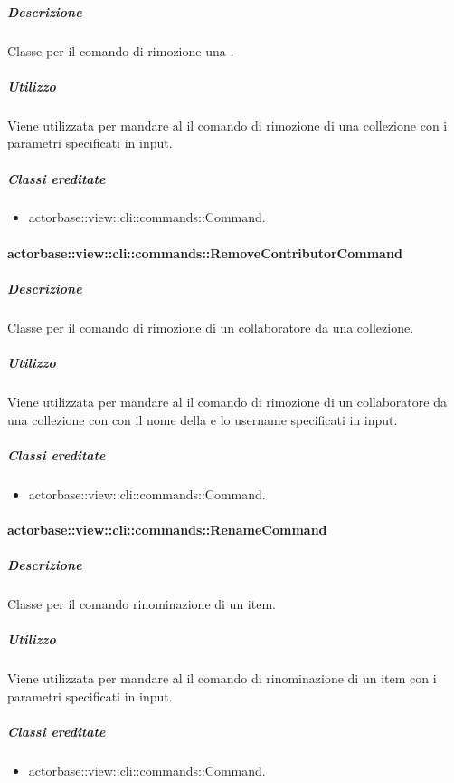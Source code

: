 \documentclass{scalatekids-article}
\begin{document}
\subparagraph{Descrizione}

Classe per il comando di rimozione una .

\subparagraph{Utilizzo}

Viene utilizzata per mandare al  il comando di rimozione di
una collezione con i parametri specificati in input.

\subparagraph{Classi ereditate}

\begin{itemize}
\item actorbase::view::cli::commands::Command.
\end{itemize}

\paragraph{actorbase::view::cli::commands::RemoveContributorCommand}

\subparagraph{Descrizione}

Classe per il comando di rimozione di un collaboratore da una collezione.

\subparagraph{Utilizzo}

Viene utilizzata per mandare al  il comando di rimozione di
un collaboratore da una collezione con con il nome della  e
lo username specificati in input.

\subparagraph{Classi ereditate}

\begin{itemize}
\item actorbase::view::cli::commands::Command.
\end{itemize}

\paragraph{actorbase::view::cli::commands::RenameCommand}

\subparagraph{Descrizione}

Classe per il comando rinominazione di un item.

\subparagraph{Utilizzo}

Viene utilizzata per mandare al  il comando di rinominazione
di un item con i parametri specificati in input.

\subparagraph{Classi ereditate}

\begin{itemize}
\item actorbase::view::cli::commands::Command.
\end{itemize}
\end{document}

